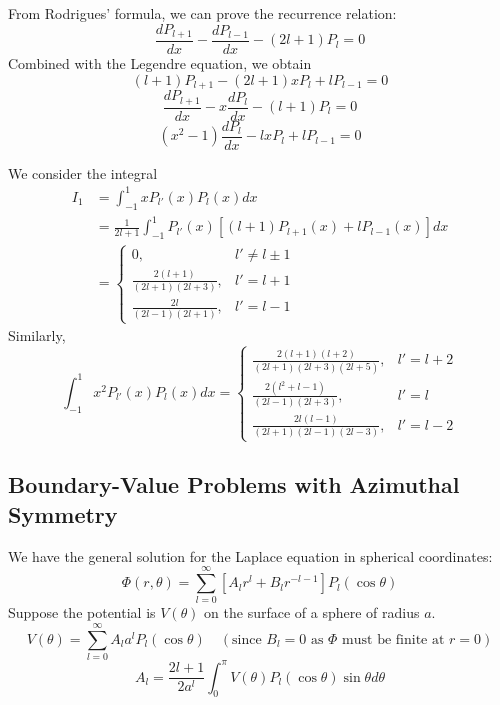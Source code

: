 \documentclass{article}
\begin{document}
	From Rodrigues' formula, we can prove the recurrence relation:
	\begin{equation}
		\frac{dP_{l+1}}{dx} - \frac{dP_{l-1}}{dx} - (2l+1)P_l = 0
	\end{equation}
	Combined with the Legendre equation, we obtain
	\begin{equation}
		(l+1)P_{l+1} - (2l+1)xP_l + lP_{l-1} = 0
	\end{equation}
	\begin{equation}
		\frac{dP_{l+1}}{dx} - x\frac{dP_l}{dx} - (l+1)P_l = 0
	\end{equation}
	\begin{equation}
		(x^2-1)\frac{dP_l}{dx} - lxP_l + lP_{l-1} = 0
	\end{equation}
	
	We consider the integral
	\begin{align}
		I_1 &= \int_{-1}^{1} x P_{l'}(x) P_l(x) dx \\
		&= \frac{1}{2l+1} \int_{-1}^{1} P_{l'}(x) [(l+1)P_{l+1}(x) + lP_{l-1}(x)] dx \\
		&= \begin{cases} 0, & l' \neq l \pm 1 \\ \frac{2(l+1)}{(2l+1)(2l+3)}, & l' = l+1 \\ \frac{2l}{(2l-1)(2l+1)}, & l' = l-1 \end{cases}
	\end{align}
	Similarly,
	\begin{equation}
		\int_{-1}^{1} x^2 P_{l'}(x) P_l(x) dx =
		\begin{cases}
			\frac{2(l+1)(l+2)}{(2l+1)(2l+3)(2l+5)}, & l'=l+2 \\
			\frac{2(l^2+l-1)}{(2l-1)(2l+3)}, & l'=l \\
			\frac{2l(l-1)}{(2l+1)(2l-1)(2l-3)}, & l'=l-2
		\end{cases}
	\end{equation}
	
	
	\subsection{Boundary-Value Problems with Azimuthal Symmetry}
	We have the general solution for the Laplace equation in spherical coordinates:
	\begin{equation}
		\Phi(r, \theta) = \sum_{l=0}^{\infty} [A_l r^l + B_l r^{-l-1}] P_l(\cos\theta)
	\end{equation}
	Suppose the potential is $V(\theta)$ on the surface of a sphere of radius $a$.
	\begin{equation}
		V(\theta) = \sum_{l=0}^{\infty} A_l a^l P_l(\cos\theta) \quad (\text{since } B_l=0 \text{ as } \Phi \text{ must be finite at } r=0)
	\end{equation}
	\begin{equation}
		A_l = \frac{2l+1}{2a^l} \int_{0}^{\pi} V(\theta) P_l(\cos\theta) \sin\theta d\theta
	\end{equation}
	
\end{document}
